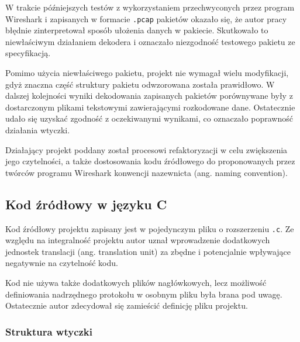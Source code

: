 \documentclass[a4paper, 11pt, twoside, openright]{article}
\begin{document}
	W trakcie późniejszych testów z wykorzystaniem przechwyconych przez program Wireshark i zapisanych w formacie \texttt{.pcap} pakietów
	okazało się, że autor pracy błędnie zinterpretował sposób ułożenia danych w pakiecie. Skutkowało to niewłaściwym działaniem
	dekodera i oznaczało niezgodność testowego pakietu ze specyfikacją.

	Pomimo użycia niewłaściwego pakietu, projekt nie wymagał wielu modyfikacji, gdyż znaczna część struktury pakietu odwzorowana została prawidłowo.
	W dalszej kolejności wyniki dekodowania zapisanych pakietów porównywane były z dostarczonym plikami tekstowymi zawierającymi rozkodowane dane.
	Ostatecznie udało się uzyskać zgodność z oczekiwanymi wynikami, co oznaczało poprawność działania wtyczki.

	Działający projekt poddany został procesowi refaktoryzacji w celu zwiększenia jego czytelności, a także dostosowania kodu źródłowego
	do proponowanych przez twórców programu Wireshark konwencji nazewnicta (ang. naming convention).

	\subsection{Kod źródłowy w języku C}

	\indent\par
	Kod źródłowy projektu zapisany jest w pojedynczym pliku o rozszerzeniu \texttt{.c}. Ze względu na integralność projektu autor uznał
	wprowadzenie dodatkowych jednostek translacji (ang. translation unit) za zbędne i potencjalnie wpływające negatywnie na czytelność kodu.

	Kod nie używa także dodatkowych plików nagłówkowych, lecz możliwość definiowania nadrzędnego protokołu w osobnym pliku była brana pod uwagę.
	Ostatecznie autor zdecydował się zamieścić definicję pliku projektu.

	\subsubsection{Struktura wtyczki}
\end{document}
